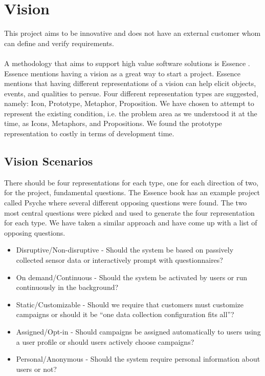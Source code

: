 
\section{Vision}
\label{sec:vision}

This project aims to be innovative and does not have an external customer whom can define and verify requirements. 
\\\\
A methodology that aims to support high value software solutions is Essence . Essence mentions having a vision as a great way to start a project. Essence mentions that having different representations of a vision can help elicit objects, events, and qualities to persue. Four different representation types are suggested, namely: Icon, Prototype, Metaphor, Proposition. We have chosen to attempt to represent the existing condition, i.e. the problem area as we understood it at the time, as Icons, Metaphors, and Propositions. We found the prototype representation to costly in terms of development time. 

\subsection{Vision Scenarios}
\label{sub:vision_scenarios}

There should be four representations for each type, one for each direction of two, for the project, fundamental questions. The Essence book has an example project called Psyche where several different opposing questions were found. The two most central questions were picked and used to generate the four representation for each type. We have taken a similar approach and have come up with a list of opposing questions. 

\begin{itemize}[itemsep=0.1em]
	\item Disruptive/Non-disruptive - Should the system be based on passively collected sensor data or interactively prompt with questionnaires? %
	\item On demand/Continuous - Should the system be activated by users or run continuously in the background? %
	\item Static/Customizable - Should we require that customers must customize campaigns or should it be ``one data collection configuration fits all''? %
	\item Assigned/Opt-in - Should campaigns be assigned automatically to users using a user profile or should users actively choose campaigns? %
	\item Personal/Anonymous - Should the system require personal information about users or not? %
\end{itemize}

